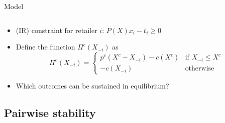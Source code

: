 \documentclass[11pt,english]{beamer}
\begin{document}
\begin{frame}[allowframebreaks]{Model}
\begin{itemize}
\begin{equation}
    \end{equation}
  \item (IR) constraint for retailer $i$: $P(X)x_i - t_i \geq 0$
  \item Define the function $\Pi^c(X_{-i})$ as
    \begin{equation}
      \label{eq:PiCXminusi}
      \Pi^c(X_{-i}) = \begin{cases}
        p^c (X^c-X_{-i})-c(X^c) & \text{if } X_{-i} \leq X^c \\
        -c(X_{-i}) & \text{otherwise}
      \end{cases}
     \end{equation}
  \item Which outcomes can be sustained in equilibrium?
  \end{itemize}
\end{frame}

\subsection{Pairwise stability}
\end{document}
